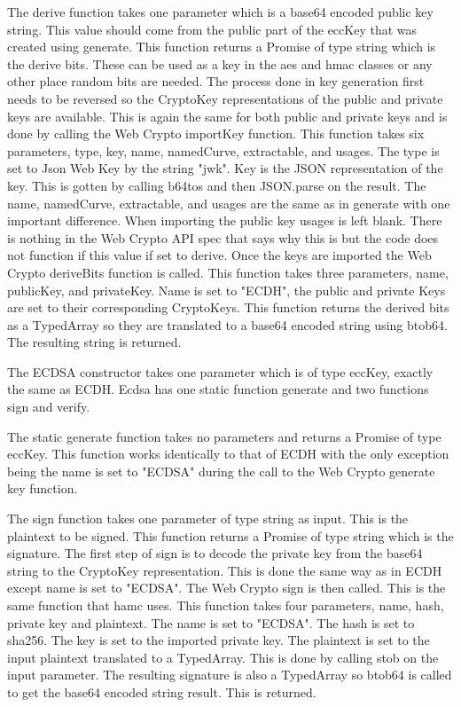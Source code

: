 The derive function takes one parameter which is a base64 encoded public key string. This value should come from the public part of the eccKey that was created using generate. This function returns a Promise of type string which is the derive bits. These can be used as a key in the aes and hmac classes or any other place random bits are needed. The process done in key generation first needs to be reversed so the CryptoKey representations of the public and private keys are available. This is again the same for both public and private keys and is done by calling the Web Crypto importKey function. This function takes six parameters, type, key, name, namedCurve, extractable, and usages. The type is set to Json Web Key by the string "jwk". Key is the JSON representation of the key. This is gotten by calling b64tos and then JSON.parse on the result. The name, namedCurve, extractable, and usages are the same as in generate with one important difference. When importing the public key usages is left blank. There is nothing in the Web Crypto API spec that says why this is but the code does not function if this value if set to derive. Once the keys are imported the Web Crypto deriveBits function is called. This function takes three parameters, name, publicKey, and privateKey. Name is set to "ECDH", the public and private Keys are set to their corresponding CryptoKeys. This function returns the derived bits as a TypedArray so they are translated to a base64 encoded string using btob64. The resulting string is returned.


The ECDSA constructor takes one parameter which is of type eccKey, exactly the same as ECDH. Ecdsa has one static function generate and two functions sign and verify.


The static generate function takes no parameters and returns a Promise of type eccKey. This function works identically to that of ECDH with the only exception being the name is set to "ECDSA" during the call to the Web Crypto generate key function.


The sign function takes one parameter of type string as input. This is the plaintext to be signed. This function returns a Promise of type string which is the signature. The first step of sign is to decode the private key from the base64 string to the CryptoKey representation. This is done the same way as in ECDH except name is set to "ECDSA". The Web Crypto sign is then called. This is the same function that hamc uses. This function takes four parameters, name, hash, private key and plaintext. The name is set to "ECDSA". The hash is set to sha256. The key is set to the imported private key. The plaintext is set to the input plaintext translated to a TypedArray. This is done by calling stob on the input parameter. The resulting signature is also a TypedArray so btob64 is called to get the base64 encoded string result. This is returned.


